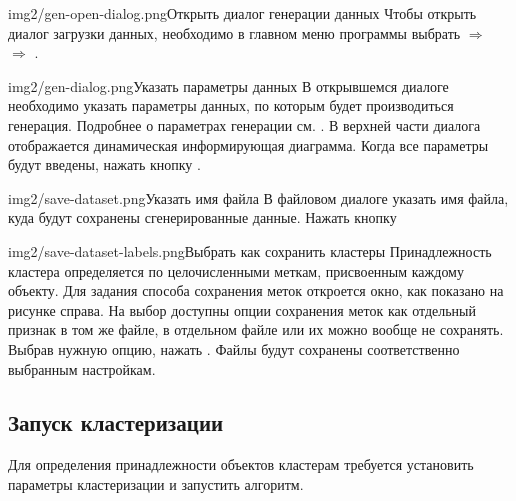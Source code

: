 \documentclass[12pt,tikz]{instruction}
\begin{document}
\begin{steps}
	\begin{ist}{img2/gen-open-dialog.png}{Открыть диалог генерации данных}
		Чтобы открыть диалог загрузки данных, необходимо в главном меню программы выбрать  $\Rightarrow$  $\Rightarrow$ .
	\end{ist}
	\begin{ist}{img2/gen-dialog.png}{Указать параметры данных}
		В открывшемся диалоге необходимо указать параметры данных, по которым будет производиться генерация. Подробнее о параметрах генерации см. \cite{kovaleva}. В верхней части диалога отображается динамическая информирующая диаграмма. Когда все параметры будут введены, нажать кнопку . \vspace{1.2cm}
	\end{ist}
	\begin{ist}{img2/save-dataset.png}{Указать имя файла}
		В файловом диалоге указать имя файла, куда будут сохранены сгенерированные данные. Нажать кнопку  
	\end{ist}
	\begin{ist}{img2/save-dataset-labels.png}{Выбрать как сохранить кластеры}
		Принадлежность кластера определяется по целочисленными меткам, присвоенным каждому объекту. Для задания способа сохранения меток откроется окно, как показано на рисунке справа. На выбор доступны опции сохранения меток как отдельный признак в том же файле, в отдельном файле или их можно вообще не сохранять. Выбрав нужную опцию, нажать . Файлы будут сохранены соответственно выбранным настройкам.
	\end{ist}
\end{steps}

\newpage
\subsection{Запуск кластеризации}

Для определения принадлежности объектов кластерам требуется установить параметры кластеризации и запустить алгоритм.
\end{document}
